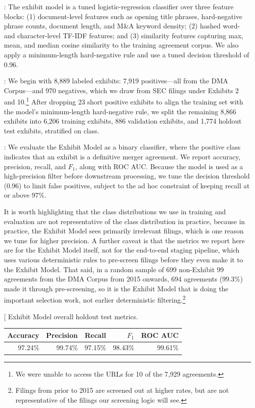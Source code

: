 \documentclass[12pt]{article}
\makeatletter
\DeclareRobustCommand{\caption}{%
  \@ifnextchar[%
    {\@captionwithopt}
    {\@captionwithoutopt}%
}
\newcommand{\@captionwithopt}[3][]{%
  \if\relax\detokenize{#3}\relax
    \caption@setopt{#1}%
    \caption@makecaption{\csname fnum@\@captype\endcsname}{}%
  \else
    \caption@setopt{#1}%
    \caption@makecaption{\csname fnum@\@captype\endcsname}{#3}%
  \fi
}
\newcommand{\@captionwithoutopt}[2]{%
  \@captionwithopt[]{#1}{#2}%
}
\makeatother
\begin{document}
\underline{}: The exhibit model is a tuned logistic-regression classifier over three feature blocks: (1) document-level features such as opening title phrases, hard-negative phrase counts, document length, and M\&A keyword density; (2) hashed word- and character-level TF-IDF features; and (3) similarity features capturing max, mean, and median cosine similarity to the training agreement corpus. We also apply a minimum-length hard-negative rule and use a tuned decision threshold of 0.96.

\underline{}: We begin with 8,889 labeled exhibits: 7,919 positives—all from the DMA Corpus—and 970 negatives, which we draw from SEC filings under Exhibits 2 and 10.\footnote{We were unable to access the URLs for 10 of the 7,929 agreements.} After dropping 23 short positive exhibits to align the training set with the model's minimum-length hard-negative rule, we split the remaining 8,866 exhibits into 6,206 training exhibits, 886 validation exhibits, and 1,774 holdout test exhibits, stratified on class.

\underline{}: We evaluate the Exhibit Model as a binary classifier, where the positive class indicates that an exhibit is a definitive merger agreement. We report accuracy, precision, recall, and \(F_1\), along with ROC AUC. Because the model is used as a high-precision filter before downstream processing, we tune the decision threshold (0.96) to limit false positives, subject to the ad hoc constraint of keeping recall at or above 97\%.

It is worth highlighting that the class distributions we use in training and evaluation are not representative of the class distribution in practice, because in practice, the Exhibit Model sees primarily irrelevant filings, which is one reason we tune for higher precision. A further caveat is that the metrics we report here are for the Exhibit Model itself, not for the end-to-end staging pipeline, which uses various deterministic rules to pre-screen filings before they even make it to the Exhibit Model. That said, in a random sample of 699 non-Exhibit 99 agreements from the DMA Corpus from 2015 onwards, 694 agreements (99.3\%) made it through pre-screening, so it is the Exhibit Model that is doing the important selection work, not earlier deterministic filtering.\footnote{Filings from prior to 2015 are screened out at higher rates, but are not representative of the filings our screening logic will see.}

\begin{table}[H]
\centering
\caption{Exhibit Model overall holdout test metrics.}
\label{tab:exhibit-overall}
\begin{tabular}{rrrrr}
\toprule
Accuracy & Precision & Recall & \(F_1\) & ROC AUC \\
\midrule
97.24\% & 99.74\% & 97.15\% & 98.43\% & 99.61\% \\
\bottomrule
\end{tabular}
\end{table}
\end{document}
